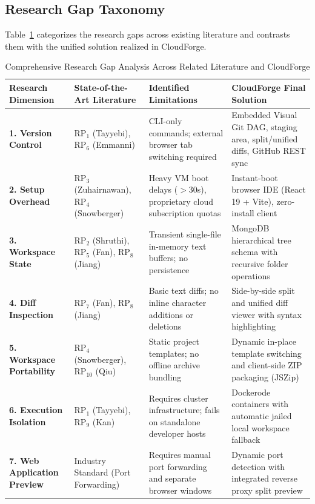 \documentclass[conference]{IEEEtran}
\begin{document}
\subsection{Research Gap Taxonomy}
Table~\ref{tab:gap_matrix} categorizes the research gaps across existing literature and contrasts them with the unified solution realized in CloudForge.

\begin{table}[t]
\centering
\caption{Comprehensive Research Gap Analysis Across Related Literature and CloudForge}
\label{tab:gap_matrix}
\begin{tabular}{@{}lp{4.2cm}p{5.5cm}p{5.2cm}@{}}
\toprule
\textbf{Research Dimension} & \textbf{State-of-the-Art Literature} & \textbf{Identified Limitations} & \textbf{CloudForge Final Solution} \\
\midrule
\textbf{1. Version Control} & $\text{RP}_1$ (Tayyebi), $\text{RP}_6$ (Emmanni) & CLI-only commands; external browser tab switching required & Embedded Visual Git DAG, staging area, split/unified diffs, GitHub REST sync \\
\textbf{2. Setup Overhead} & $\text{RP}_3$ (Zuhairnawan), $\text{RP}_4$ (Snowberger) & Heavy VM boot delays ($>$30s), proprietary cloud subscription quotas & Instant-boot browser IDE (React 19 + Vite), zero-install client \\
\textbf{3. Workspace State} & $\text{RP}_2$ (Shruthi), $\text{RP}_5$ (Fan), $\text{RP}_8$ (Jiang) & Transient single-file in-memory text buffers; no persistence & MongoDB hierarchical tree schema with recursive folder operations \\
\textbf{4. Diff Inspection} & $\text{RP}_7$ (Fan), $\text{RP}_8$ (Jiang) & Basic text diffs; no inline character additions or deletions & Side-by-side split and unified diff viewer with syntax highlighting \\
\textbf{5. Workspace Portability} & $\text{RP}_4$ (Snowberger), $\text{RP}_{10}$ (Qiu) & Static project templates; no offline archive bundling & Dynamic in-place template switching and client-side ZIP packaging (JSZip) \\
\textbf{6. Execution Isolation} & $\text{RP}_1$ (Tayyebi), $\text{RP}_9$ (Kan) & Requires cluster infrastructure; fails on standalone developer hosts & Dockerode containers with automatic jailed local workspace fallback \\
\textbf{7. Web Application Preview} & Industry Standard (Port Forwarding) & Requires manual port forwarding and separate browser windows & Dynamic port detection with integrated reverse proxy split preview \\
\bottomrule
\end{tabular}
\end{table}
\end{document}
